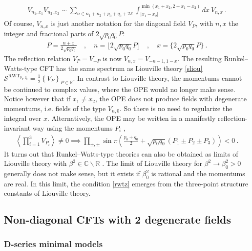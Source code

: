 \documentclass[12pt, a4paper]{article}
\theoremstyle{break}
\begin{document}
\begin{align}
 \boxed{V_{n_1,x_1}V_{n_2,x_2} \sim \sum_{n\in n_1+n_2+p_0+q_0+2\mathbb{Z}}
\int_{|x_1-x_2|}^{\min (x_1+x_2,2-x_1-x_2)} dx\ V_{n, x}}\ .
\end{align}
Of course, $V_{n,x}$ is just another notation for the diagonal field $V_P$, with $n,x$ the integer and fractional parts of $2\sqrt{p_0q_0}P$:
\begin{align}
 P=\frac{n+x}{2\sqrt{p_0q_0}} \quad , \quad n=\Big\lfloor 2\sqrt{p_0q_0}P \Big\rfloor \quad , \quad x = \Big\{2\sqrt{p_0q_0}P \Big\}\ .
\end{align}
The reflection relation $V_P=V_{-P}$ is now $V_{n,x}=V_{-n-1,1-x}$. 
The resulting Runkel--Watts-type CFT has the same spectrum as Liouville theory \eqref{sliou} $
 \mathcal{S}^{\text{RWT}_{p_0,q_0}} = \frac12 \left\{ V_P\right\}_{P\in \mathbb{R}}$. In contrast to Liouville theory, the momentums cannot be continued to complex values, where the OPE would no longer make sense. Notice however that if $x_1\neq x_2$, the OPE does not produce fields with degenerate momentums, i.e. fields of the type $V_{n,0}$. So there is no need to regularize the integral over $x$. Alternatively, the OPE may be written in a manifestly reflection-invariant way using the momentums $P_i$ \cite{rs15},
 \begin{align}
  \left<\prod_{i=1}^3 V_{P_i}\right>\neq 0 \implies \prod_{\pm,\pm} \sin\pi\left(\tfrac{p_0+q_0}{2}+\sqrt{p_0q_0}(P_1\pm P_2\pm P_3)\right) < 0 \ .
  \label{rwtz}
 \end{align}
It turns out that Runkel--Watts-type theories can also be obtained as limits of Liouville theory with $\beta^2\in \mathbb{C}\backslash \mathbb{R}$ \cite{mce07}. The limit of Liouville theory for $\beta^2\to \beta_0^2>0$ generally does not make sense, but it exists if $\beta_0^2$ is rational and the momentums are real. In this limit, the condition \eqref{rwtz} emerges from the three-point structure constants of Liouville theory. 


\subsection{Non-diagonal CFTs with 2 degenerate fields}

\subsubsection{D-series minimal models}
\end{document}
